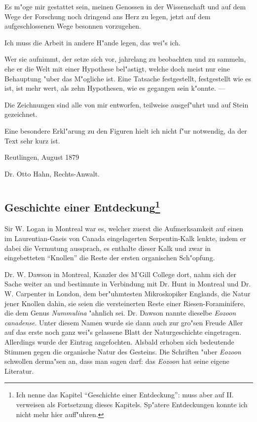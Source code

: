 \documentclass[a4paper, 11pt, oneside, german]{article}
\begin{document}
Es m"oge mir gestattet sein, meinen Genossen in der Wissenschaft und auf dem Wege der Forschung noch dringend ans Herz zu legen, jetzt auf dem aufgeschlossenen Wege besonnen vorzugehen.

Ich muss die Arbeit in andere H"ande legen, das wei"s ich.

Wer sie aufnimmt, der setze sich vor, jahrelang zu beobachten und zu sammeln, ehe er die Welt mit einer Hypothese bel"astigt, welche doch meist nur eine Behauptung "uber das M"ogliche ist. Eine Tatsache festgestellt, festgestellt wie es ist, ist mehr wert, als zehn Hypothesen, wie es gegangen sein k"onnte. ---

Die Zeichnungen sind alle von mir entworfen, teilweise ausgef"uhrt und auf Stein gezeichnet.

Eine besondere Erkl"arung zu den Figuren hielt ich nicht f"ur notwendig, da der Text sehr kurz ist.

Reutlingen, August 1879

Dr. Otto Hahn, Rechts-Anwalt.
\clearpage
\section{}
\subsection[Geschichte einer Entdeckung]{Geschichte einer Entdeckung\footnote{Ich nenne das Kapitel "`Geschichte einer Entdeckung"': muss aber auf II. verweisen als Fortsetzung dieses Kapitels. Sp"atere Entdeckungen konnte ich nicht mehr hier auff"uhren.}}
\paragraph{}
Sir W. Logan in Montreal war es, welcher zuerst die Aufmerksamkeit auf einen im Laurentian-Gneis von Canada eingelagerten Serpentin-Kalk lenkte, indem er dabei die Vermutung aussprach, es enthalte dieser Kalk und zwar in eingebetteten "`Knollen"' die Reste der ersten organischen Sch"opfung.

Dr. W. Dawson in Montreal, Kanzler des M'Gill College dort, nahm sich der Sache weiter an und bestimmte in Verbindung mit Dr. Hunt in Montreal und Dr. W. Carpenter in London, dem ber"uhmtesten Mikroskopiker Englands, die Natur jener Knollen dahin, sie seien die versteinerten Reste einer Riesen-Foraminifere, die dem Genus \emph{Nummulina} "ahnlich sei. Dr. Dawson nannte dieselbe \emph{Eozoon canadense}. Unter diesem Namen wurde sie dann auch zur gro"sen Freude Aller auf das erste noch ganz wei"s gelassene Blatt der Naturgeschichte eingetragen. Allerdings wurde der Eintrag angefochten. Alsbald erhoben sich bedeutende Stimmen gegen die organische Natur des Gesteins. Die Schriften "uber \emph{Eozoon} schwollen derma"sen an, dass man sagen darf: das \emph{Eozoon} hat seine eigene Literatur.
\end{document}
